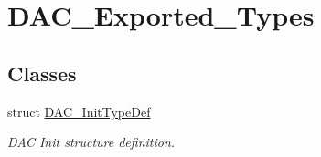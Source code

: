 \hypertarget{group__DAC__Exported__Types}{
\section{DAC\_\-Exported\_\-Types}
\label{group__DAC__Exported__Types}
}
\subsection*{Classes}
\begin{DoxyCompactItemize}
\item 
struct \hyperlink{structDAC__InitTypeDef}{DAC\_\-InitTypeDef}
\begin{DoxyCompactList}\small\item\em DAC Init structure definition. \item\end{DoxyCompactList}\end{DoxyCompactItemize}
